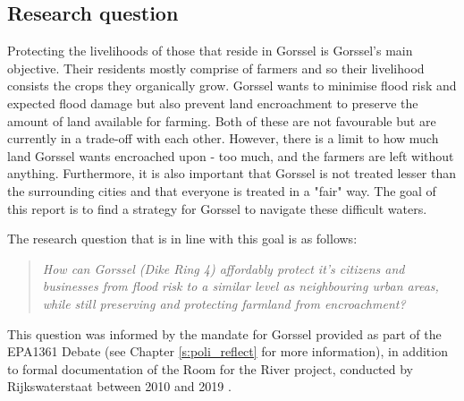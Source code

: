 


\subsection{Research question}

Protecting the livelihoods of those that reside in Gorssel is Gorssel's main objective. Their residents mostly comprise of farmers and so their livelihood consists the crops they organically grow. Gorssel wants to minimise flood risk and expected flood damage but also prevent land encroachment to preserve the amount of land available for farming. Both of these are not favourable but are currently in a trade-off with each other. However, there is a limit to how much land Gorssel wants encroached upon - too much, and the farmers are left without anything. Furthermore, it is also important that Gorssel is not treated lesser than the surrounding cities and that everyone is treated in a "fair" way. 
The goal of this report is to find a strategy for Gorssel to navigate these difficult waters. 


The research question that is in line with this goal is as follows: 
\begin{quote}
    \textit{How can Gorssel (Dike Ring 4) affordably protect it's citizens and businesses from flood risk to a similar level as neighbouring urban areas, while still preserving and protecting farmland from encroachment?}
\end{quote}

This question was informed by the mandate for Gorssel provided as part of the EPA1361 Debate (see Chapter \ref{s:poli_reflect} for more information), in addition to formal documentation of the Room for the River project, conducted by Rijkswaterstaat between 2010 and 2019 \parencite{rijkswaterstaat_tailor_2013,rijke_room_2012}.

